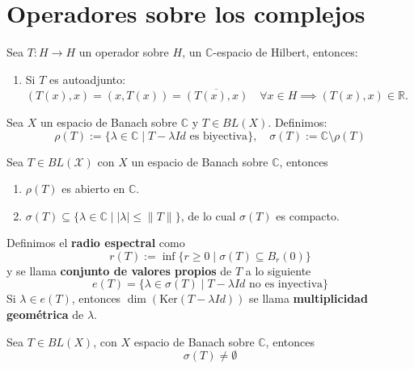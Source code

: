 \section{Operadores sobre los complejos}

\noindent 
Sea $T: H \to H$ un operador sobre $H$, un $\mathbb{C}$-espacio de Hilbert, entonces:
\begin{enumerate}
    \item[i)] Si $T$ es autoadjunto: $(T(x), x) = (x, T(x)) = \overline{(T(x), x)} \quad \forall x \in H \implies (T(x), x) \in \mathbb{R}$. \\
\end{enumerate}

\noindent 
Sea $X$ un espacio de Banach sobre $\mathbb{C}$ y $T \in BL(X)$. Definimos:
\[ \rho(T) := \{ \lambda \in \mathbb{C} \mid T - \lambda Id \text{ es biyectiva} \}, \quad \sigma(T) := \mathbb{C} \setminus \rho(T) \]

\begin{prop}
    Sea $T\in BL(\mathcal{X})$ con $X$ un espacio de Banach sobre $\mathbb{C}$, entonces \begin{enumerate}
        \item $\rho(T)$ es abierto en $\mathbb{C}$.
        \item $\sigma(T) \subseteq \{ \lambda \in \mathbb{C} \mid |\lambda| \leq \|T\| \}$, de lo cual $\sigma(T)$ es compacto.
    \end{enumerate}
\end{prop}

\begin{definicion}
    Definimos el \textbf{radio espectral} como  
    $$r(T) := \inf \{ r \geq 0 \mid \sigma(T) \subseteq B_r(0) \}$$
    y se llama \textbf{conjunto de valores propios} de $T$ a lo siguiente
    $$e(T) = \{ \lambda \in \sigma(T) \mid T - \lambda Id \text{ no es inyectiva} \}$$    
    Si $\lambda \in e(T)$, entonces $\dim(\text{Ker}(T - \lambda Id))$ se llama \textbf{multiplicidad geométrica} de $\lambda$.
\end{definicion}

\begin{teo}
    Sea $T \in BL(X)$, con $X$ espacio de Banach sobre $\mathbb{C}$, entonces 
    $$\sigma(T) \neq \emptyset$$
\end{teo}

